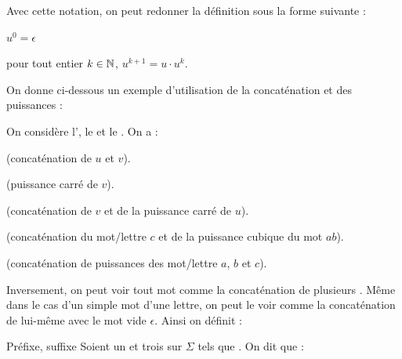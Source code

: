 \documentclass[a4paper,french,bookmarks]{book}
\begin{document}
    Avec cette notation, on peut redonner la définition sous la forme suivante :
    \begin{enumerate}
        \begin{minipage}{0.5\linewidth}
            \itt $u^0 = \epsilon$
        \end{minipage}
        \begin{minipage}{0.5\linewidth}
            \itt pour tout entier $k \in \mathbb{N}$, $u^{k+1} = u \cdot u^k$.
        \end{minipage}
    \end{enumerate}
    
    On donne ci-dessous un exemple d'utilisation de la concaténation et des puissances :
    
    \begin{example}{}{}
        On considère l', le  et le . On a :
        \begin{enumerate}
            \itt {} (concaténation de $u$ et $v$).
            
            \itt {} (puissance carré de $v$).
            
            \itt {} (concaténation de $v$ et de la puissance carré de $u$).
            
            \itt {} (concaténation du mot/lettre $c$ et de la puissance cubique du mot $ab$).
            
            \itt {} (concaténation de puissances des mot/lettre $a$, $b$ et $c$).
        \end{enumerate}
    \end{example}
    
    Inversement, on peut voir tout mot comme la concaténation de plusieurs . Même dans le cas d'un simple mot d'une lettre, on peut le voir comme la concaténation de lui-même avec le mot vide $\epsilon$. Ainsi on définit : 
    
    \begin{definition}{Préfixe, suffixe}{}
        Soient \hg{$\Sigma$} un  et trois  sur $\Sigma$ tels que . On dit que :
        \begin{enumerate}
            \begin{minipage}{0.5\linewidth}
                \itast {}
            \end{minipage}
            \begin{minipage}{0.5\linewidth}
                \itast {}
            \end{minipage}
        \end{enumerate}
    \end{definition}
    
\end{document}
